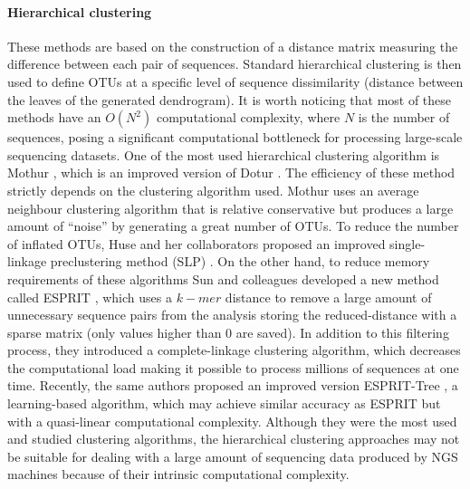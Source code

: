 \paragraph{Hierarchical clustering}
These methods are based on the construction of a distance matrix measuring the difference between each pair of sequences. Standard hierarchical clustering is then used to define OTUs at a specific level of sequence dissimilarity (distance between the leaves of the generated dendrogram). It is worth noticing that most of these methods have an $O(N^{2})$ computational complexity, where $N$ is the number of sequences, posing a significant computational bottleneck for processing large-scale sequencing datasets. One of the most used hierarchical clustering algorithm is Mothur \cite{schloss2009introducing}, which is an improved version of Dotur \cite{schloss2005introducing}. The efficiency of these method strictly depends on the clustering algorithm used. Mothur uses an average neighbour clustering algorithm that is relative conservative but produces a large amount of ``noise'' by generating a great number of OTUs. To reduce the number of inflated OTUs, Huse and her collaborators proposed an improved single-linkage preclustering method (SLP) \cite{huse2010ironing}. On the other hand, to reduce memory requirements of these algorithms Sun and colleagues developed a new method called ESPRIT \cite{sun2009esprit}, which uses a $k-mer$ distance to remove a large amount of unnecessary sequence pairs from the analysis storing the reduced-distance with a sparse matrix (only values higher than 0 are saved). In addition to this filtering process, they introduced a complete-linkage clustering algorithm, which decreases the computational load making it possible to process millions of sequences at one time. Recently, the same authors proposed an improved version ESPRIT-Tree \cite{cai2011esprit}, a learning-based algorithm, which may achieve similar accuracy as ESPRIT but with a quasi-linear computational complexity. Although they were the most used and studied clustering algorithms, the hierarchical clustering approaches may not be suitable for dealing with a large amount of sequencing data produced by NGS machines because of their intrinsic computational complexity.\\

